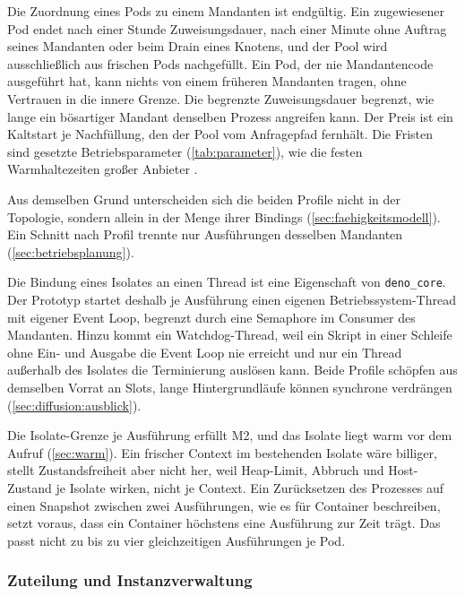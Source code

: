 Die Zuordnung eines Pods zu einem Mandanten ist endgültig. Ein zugewiesener Pod endet nach einer Stunde
Zuweisungsdauer, nach einer Minute ohne Auftrag seines Mandanten oder beim Drain eines Knotens, und der Pool wird
ausschließlich aus frischen Pods nachgefüllt. Ein Pod, der nie Mandantencode ausgeführt hat, kann nichts von einem
früheren Mandanten tragen, ohne Vertrauen in die innere Grenze. Die begrenzte Zuweisungsdauer begrenzt, wie lange
ein bösartiger Mandant denselben Prozess angreifen kann. Der Preis ist ein Kaltstart je Nachfüllung, den der Pool vom
Anfragepfad fernhält. Die Fristen sind gesetzte Betriebsparameter (\autoref{tab:parameter}), wie die festen
Warmhaltezeiten großer Anbieter \autocite[S.~206]{shahrad_serverless_2020}.

Aus demselben Grund unterscheiden sich die beiden Profile nicht in der Topologie, sondern allein in der Menge ihrer
Bindings (\autoref{sec:faehigkeitsmodell}). Ein Schnitt nach Profil trennte nur Ausführungen desselben Mandanten
(\autoref{sec:betriebsplanung}).

Die Bindung eines Isolates an einen Thread ist eine Eigenschaft von \texttt{deno\_core}. Der Prototyp startet deshalb je
Ausführung einen eigenen Betriebssystem-Thread mit eigener Event Loop, begrenzt durch eine Semaphore im Consumer des Mandanten.
Hinzu kommt ein Watchdog-Thread, weil ein Skript in einer Schleife ohne Ein- und Ausgabe die Event Loop nie erreicht und nur
ein Thread außerhalb des Isolates die Terminierung auslösen kann. Beide Profile schöpfen aus demselben Vorrat an Slots, lange Hintergrundläufe
können synchrone verdrängen (\autoref{sec:diffusion:ausblick}).

Die Isolate-Grenze je Ausführung erfüllt M2, und das Isolate liegt warm vor dem Aufruf
(\autoref{sec:warm}). Ein frischer Context im bestehenden Isolate wäre billiger, stellt Zustandsfreiheit
aber nicht her, weil Heap-Limit, Abbruch und Host-Zustand je Isolate wirken, nicht je Context. Ein Zurücksetzen des Prozesses auf einen Snapshot zwischen
zwei Ausführungen, wie \textcite[S.~398]{alzayat_groundhog_2023} es für Container beschreiben, setzt voraus, dass ein
Container höchstens eine Ausführung zur Zeit trägt. Das passt nicht zu bis zu vier gleichzeitigen Ausführungen je Pod.

\subsubsection{Zuteilung und Instanzverwaltung}
\label{sec:zuteilung}

